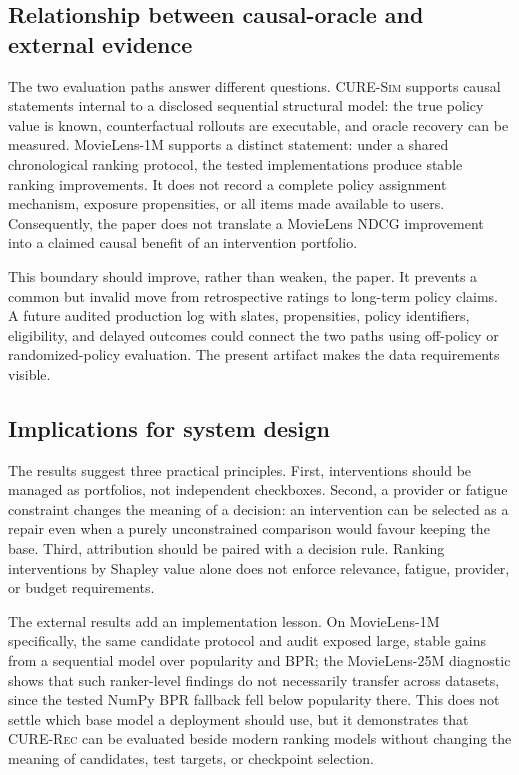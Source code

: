 \documentclass[pdflatex,sn-mathphys-num]{sn-jnl}
\theoremstyle{thmstyleone}
\theoremstyle{thmstyletwo}
\theoremstyle{thmstylethree}
\newcommand{\CURE}{\textsc{CURE-Rec}}
\newcommand{\Sim}{\textsc{CURE-Sim}}
\begin{document}
\subsection{Relationship between causal-oracle and external evidence}

The two evaluation paths answer different questions. \Sim{} supports causal statements internal to a disclosed sequential structural model: the true policy value is known, counterfactual rollouts are executable, and oracle recovery can be measured. MovieLens-1M supports a distinct statement: under a shared chronological ranking protocol, the tested implementations produce stable ranking improvements. It does not record a complete policy assignment mechanism, exposure propensities, or all items made available to users. Consequently, the paper does not translate a MovieLens NDCG improvement into a claimed causal benefit of an intervention portfolio.

This boundary should improve, rather than weaken, the paper. It prevents a common but invalid move from retrospective ratings to long-term policy claims. A future audited production log with slates, propensities, policy identifiers, eligibility, and delayed outcomes could connect the two paths using off-policy or randomized-policy evaluation. The present artifact makes the data requirements visible.

\subsection{Implications for system design}

The results suggest three practical principles. First, interventions should be managed as portfolios, not independent checkboxes. Second, a provider or fatigue constraint changes the meaning of a decision: an intervention can be selected as a repair even when a purely unconstrained comparison would favour keeping the base. Third, attribution should be paired with a decision rule. Ranking interventions by Shapley value alone does not enforce relevance, fatigue, provider, or budget requirements.

The external results add an implementation lesson. On MovieLens-1M specifically, the same candidate protocol and audit exposed large, stable gains from a sequential model over popularity and BPR; the MovieLens-25M diagnostic shows that such ranker-level findings do not necessarily transfer across datasets, since the tested NumPy BPR fallback fell below popularity there. This does not settle which base model a deployment should use, but it demonstrates that \CURE{} can be evaluated beside modern ranking models without changing the meaning of candidates, test targets, or checkpoint selection.
\end{document}
